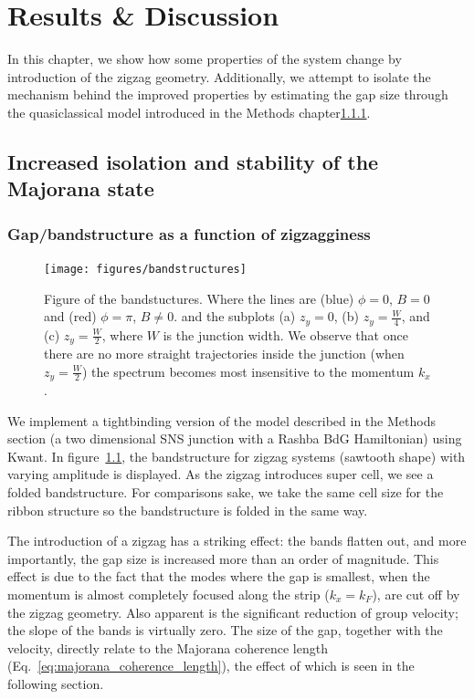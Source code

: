 \chapter{Results \& Discussion}
		In this chapter, we show how some properties of the system change by introduction of the zigzag geometry.
		Additionally, we attempt to isolate the mechanism behind the improved properties by estimating the gap size through the quasiclassical model introduced in the Methods chapter\ref{}.
		
	\section{Increased isolation and stability of the Majorana state}

		\subsection{Gap/bandstructure as a function of zigzagginess}

			\begin{figure}[!htb]
			\centering
			\texttt{[image: figures/bandstructures]}
			\caption{Figure of the bandstuctures.
			Where the lines are (blue) $\phi=0$, $B=0$ and (red) $\phi=\pi$, $B \ne 0$.
			and the subplots (a) $z_y=0$, (b) $z_y=\frac{W}{4}$, and (c) $z_y=\frac{W}{2}$, where $W$ is the junction width.
			We observe that once there are no more straight trajectories inside the junction (when $z_y=\frac{W}{2}$) the spectrum becomes most insensitive to the momentum $k_x$.
			\label{fig:bandstuctures}}
			\end{figure}
			We implement a tightbinding version of the model described in the Methods section (a two dimensional SNS junction with a Rashba BdG Hamiltonian) using Kwant.
			In figure~\ref{fig:bandstuctures}, the bandstructure for zigzag systems (sawtooth shape) with varying amplitude is displayed.
			As the zigzag introduces super cell, we see a folded bandstructure.
			For comparisons sake, we take the same cell size for the ribbon structure so the bandstructure is folded in the same way.

			The introduction of a zigzag has a striking effect: the bands flatten out, and more importantly, the gap size is increased more than an order of magnitude.
			This effect is due to the fact that the modes where the gap is smallest, when the momentum is almost completely focused along the strip ($k_x=k_F$), are cut off by the zigzag geometry.
			Also apparent is the significant reduction of group velocity; the slope of the bands is virtually zero.
			The size of the gap, together with the velocity, directly relate to the Majorana coherence length (Eq.~\eqref{eq:majorana_coherence_length}), the effect of which is seen in the following section.

